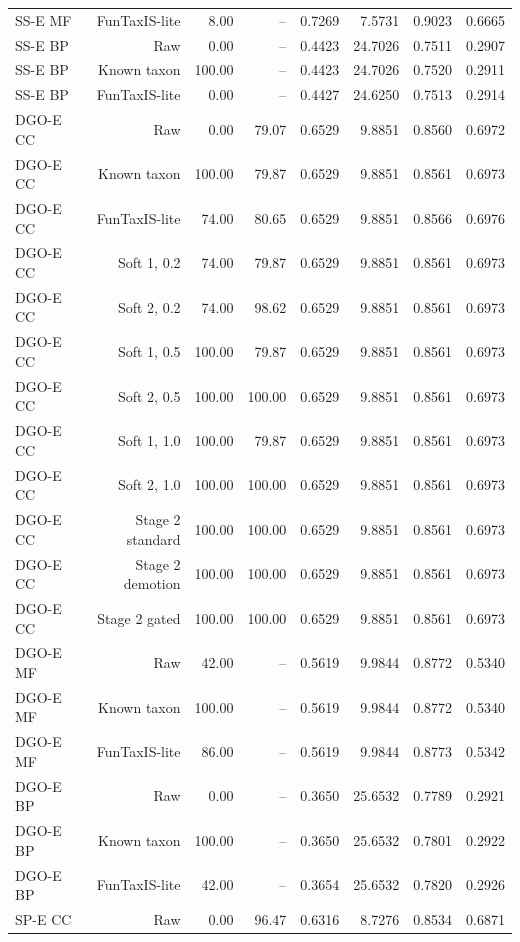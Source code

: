 \begin{longtable}{lrrrrrrr}
SS-E MF & FunTaxIS-lite & 8.00 & -- & 0.7269 & 7.5731 & 0.9023 & 0.6665 \\
SS-E BP & Raw & 0.00 & -- & 0.4423 & 24.7026 & 0.7511 & 0.2907 \\
SS-E BP & Known taxon & 100.00 & -- & 0.4423 & 24.7026 & 0.7520 & 0.2911 \\
SS-E BP & FunTaxIS-lite & 0.00 & -- & 0.4427 & 24.6250 & 0.7513 & 0.2914 \\
DGO-E CC & Raw & 0.00 & 79.07 & 0.6529 & 9.8851 & 0.8560 & 0.6972 \\
DGO-E CC & Known taxon & 100.00 & 79.87 & 0.6529 & 9.8851 & 0.8561 & 0.6973 \\
DGO-E CC & FunTaxIS-lite & 74.00 & 80.65 & 0.6529 & 9.8851 & 0.8566 & 0.6976 \\
DGO-E CC & Soft 1, 0.2 & 74.00 & 79.87 & 0.6529 & 9.8851 & 0.8561 & 0.6973 \\
DGO-E CC & Soft 2, 0.2 & 74.00 & 98.62 & 0.6529 & 9.8851 & 0.8561 & 0.6973 \\
DGO-E CC & Soft 1, 0.5 & 100.00 & 79.87 & 0.6529 & 9.8851 & 0.8561 & 0.6973 \\
DGO-E CC & Soft 2, 0.5 & 100.00 & 100.00 & 0.6529 & 9.8851 & 0.8561 & 0.6973 \\
DGO-E CC & Soft 1, 1.0 & 100.00 & 79.87 & 0.6529 & 9.8851 & 0.8561 & 0.6973 \\
DGO-E CC & Soft 2, 1.0 & 100.00 & 100.00 & 0.6529 & 9.8851 & 0.8561 & 0.6973 \\
DGO-E CC & Stage 2 standard & 100.00 & 100.00 & 0.6529 & 9.8851 & 0.8561 & 0.6973 \\
DGO-E CC & Stage 2 demotion & 100.00 & 100.00 & 0.6529 & 9.8851 & 0.8561 & 0.6973 \\
DGO-E CC & Stage 2 gated & 100.00 & 100.00 & 0.6529 & 9.8851 & 0.8561 & 0.6973 \\
DGO-E MF & Raw & 42.00 & -- & 0.5619 & 9.9844 & 0.8772 & 0.5340 \\
DGO-E MF & Known taxon & 100.00 & -- & 0.5619 & 9.9844 & 0.8772 & 0.5340 \\
DGO-E MF & FunTaxIS-lite & 86.00 & -- & 0.5619 & 9.9844 & 0.8773 & 0.5342 \\
DGO-E BP & Raw & 0.00 & -- & 0.3650 & 25.6532 & 0.7789 & 0.2921 \\
DGO-E BP & Known taxon & 100.00 & -- & 0.3650 & 25.6532 & 0.7801 & 0.2922 \\
DGO-E BP & FunTaxIS-lite & 42.00 & -- & 0.3654 & 25.6532 & 0.7820 & 0.2926 \\
SP-E CC & Raw & 0.00 & 96.47 & 0.6316 & 8.7276 & 0.8534 & 0.6871 \\

\end{longtable}

